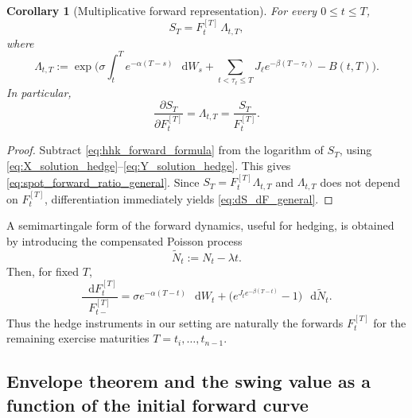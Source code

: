 \documentclass[10pt,a4paper,reqno]{amsart}
\newcommand{\<}{\langle}
\renewcommand{\>}{\rangle}
\newtheorem{corollary}[theorem]{Corollary}
\theoremstyle{example}
\newcommand*\D{\mathop{}\!\mathrm{d}}
\begin{document}
\begin{corollary}[Multiplicative forward representation]
\label{cor:mult_forward_rep}
For every $0 \le t \le T$,
\begin{equation}
\label{eq:spot_forward_ratio_general}
S_T = F_t^{[T]} \,\Lambda_{t,T},
\end{equation}
where
\begin{equation}
\label{eq:lambda_tT}
\Lambda_{t,T}
:=
\exp\!\Bigg(
\sigma \int_t^T e^{-\alpha(T-s)}\,\D W_s
+
\sum_{t<\tau_\ell\le T} J_\ell e^{-\beta(T-\tau_\ell)}
-
B(t,T)
\Bigg).
\end{equation}
In particular,
\begin{equation}
\label{eq:dS_dF_general}
\frac{\partial S_T}{\partial F_t^{[T]}}
=
\Lambda_{t,T}
=
\frac{S_T}{F_t^{[T]}}.
\end{equation}
\end{corollary}

\begin{proof}
Subtract \eqref{eq:hhk_forward_formula} from the logarithm of $S_T$, using
\eqref{eq:X_solution_hedge}--\eqref{eq:Y_solution_hedge}. This gives
\eqref{eq:spot_forward_ratio_general}. Since $S_T = F_t^{[T]} \Lambda_{t,T}$ and
$\Lambda_{t,T}$ does not depend on $F_t^{[T]}$, differentiation immediately yields
\eqref{eq:dS_dF_general}.
\end{proof}

A semimartingale form of the forward dynamics, useful for hedging, is obtained by introducing the
compensated Poisson process
\[
\widetilde{N}_t := N_t - \lambda t.
\]
Then, for fixed $T$,
\begin{equation}
\label{eq:forward_sde_hedge}
\frac{\D F_t^{[T]}}{F_{t-}^{[T]}}
=
\sigma e^{-\alpha(T-t)}\,\D W_t
+
\Big(
e^{J_t e^{-\beta(T-t)}}-1
\Big)\,\D \widetilde{N}_t.
\end{equation}
Thus the hedge instruments in our setting are naturally the forwards $F_t^{[T]}$ for the remaining
exercise maturities $T=t_i,\dots,t_{n-1}$.

\subsection{Envelope theorem and the swing value as a function of the initial forward curve}
\end{document}

